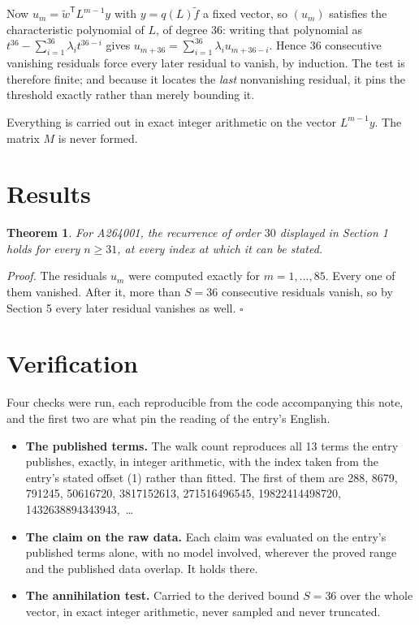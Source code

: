 \documentclass[11pt]{article}
\newtheorem{theorem}{Theorem}
\theoremstyle{definition}
\begin{document}
Now $u_m = \tilde w^{\mathsf T} L^{m-1} y$ with $y = q(L)\tilde f$ a fixed vector, so $(u_m)$ satisfies the characteristic polynomial of $L$, of degree $36$: writing that polynomial as $t^{36} - \sum_{i=1}^{36} \lambda_i t^{36-i}$ gives $u_{m+36} = \sum_{i=1}^{36} \lambda_i u_{m+36-i}$. Hence $36$ consecutive vanishing residuals force every later residual to vanish, by induction. The test is therefore finite; and because it locates the {\itshape last} nonvanishing residual, it pins the threshold exactly rather than merely bounding it.

Everything is carried out in exact integer arithmetic on the vector $L^{m-1}y$. The matrix $M$ is never formed.

\section{Results}

\begin{theorem} For A264001, the recurrence of order $30$ displayed in Section 1 holds for every $n \ge 31$, at every index at which it can be stated.\end{theorem}

{\itshape Proof.} The residuals $u_m$ were computed exactly for $m = 1,\dots,85$. Every one of them vanished. After it, more than $S = 36$ consecutive residuals vanish, so by Section 5 every later residual vanishes as well. $\square$

\section{Verification}

Four checks were run, each reproducible from the code accompanying this note, and the first two are what pin the reading of the entry's English.

\begin{itemize}

\item {\bfseries The published terms.} The walk count reproduces all 13 terms the entry publishes, exactly, in integer arithmetic, with the index taken from the entry's stated offset (1) rather than fitted. The first of them are 288, 8679, 791245, 50616720, 3817152613, 271516496545, 19822414498720, 1432638894343943,~\dots

\item {\bfseries The claim on the raw data.} Each claim was evaluated on the entry's published terms alone, with no model involved, wherever the proved range and the published data overlap. It holds there.

\item {\bfseries The annihilation test.} Carried to the derived bound $S = 36$ over the whole vector, in exact integer arithmetic, never sampled and never truncated.

\end{itemize}
\end{document}
